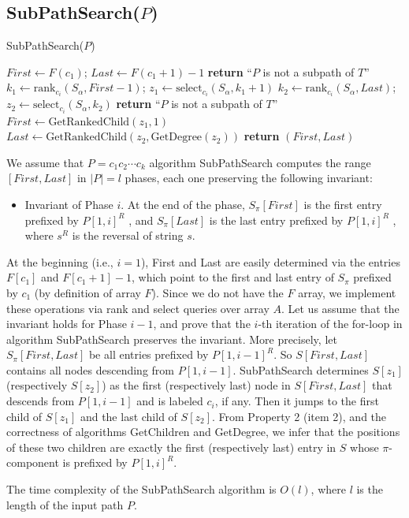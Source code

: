 \subsection*{SubPathSearch($P$)}

\begin{algorithm}[H]
    \caption{SubPathSearch($P$)}
    \label{alg:subpathsearch}
    \begin{algorithmic}[1]
    \State $First \gets F(c_1)$; $Last \gets F(c_1 + 1) - 1$
        \State \textbf{return} ``$P$ is not a subpath of $T$''
    \EndIf
        \State $k_1 \gets \text{rank}_{c_i}(S_\alpha, First - 1)$; $z_1 \gets \text{select}_{c_i}(S_\alpha, k_1 + 1)$
        \State $k_2 \gets \text{rank}_{c_i}(S_\alpha, Last)$; $z_2 \gets \text{select}_{c_i}(S_\alpha, k_2)$
            \State \textbf{return} ``$P$ is not a subpath of $T$''
        \EndIf
        \State $First \gets \text{GetRankedChild}(z_1, 1)$ 
        \State $Last \gets \text{GetRankedChild}(z_2, \text{GetDegree}(z_2))$ 
    \EndFor
    \State \textbf{return} $(First, Last)$
    \end{algorithmic}
\end{algorithm}

We assume that $P = c_1c_2 \cdots c_k$ algorithm SubPathSearch computes the range $[First, Last]$ in $|P| = l$ phases, each one preserving the following invariant:

\begin{itemize}
    \item Invariant of Phase $i$. At the end of the phase, $S_{\pi}[First]$ is the first entry prefixed by $P[1, i]^R$ , and $S_{\pi}[Last]$ is the last entry prefixed by $P[1, i]^R$ , where $s^R$ is the reversal of string $s$.
\end{itemize}

At the beginning (i.e., $i = 1$), First and Last are easily determined via the entries $F[c_1]$ and $F[c_1 + 1] - 1$, which point to the first and last entry of $S_{\pi}$ prefixed by $c_1$ (by definition of array $F$). Since we do not have the $F$ array, we implement these operations via rank and select queries over array $A$. Let us assume that the invariant holds for Phase $i - 1$, and prove that the $i$-th iteration of the for-loop in algorithm SubPathSearch preserves the invariant. More precisely, let $S_{\pi}[First, Last]$ be all entries prefixed by $P[1, i - 1]^R$. So $S[First, Last]$ contains all nodes descending from $P[1, i - 1]$. SubPathSearch determines $S[z_1]$ (respectively $S[z_2]$) as the first (respectively last) node in $S[First, Last]$ that descends from $P[1, i - 1]$ and is labeled $c_i$, if any. Then it jumps to the first child of $S[z_1]$ and the last child of $S[z_2]$. From Property 2 (item 2), and the correctness of algorithms GetChildren and GetDegree, we infer that the positions of these two children are exactly the first (respectively last) entry in $S$ whose $\pi$-component is prefixed by $P[1, i]^R$. 

The time complexity of the SubPathSearch algorithm is $O(l)$, where $l$ is the length of the input path $P$.
